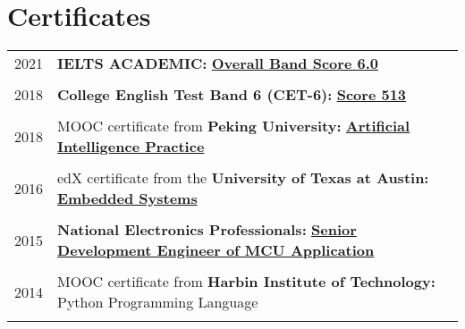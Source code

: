 \documentclass[a4paper,10pt]{article} %
\begin{document}
\section{Certificates}
\begin{tabular}{r|l}	
2021                        & \textbf{IELTS ACADEMIC:} \href{https://nbviewer.org/github/HuangJiaLian/DataBase0/blob/cd031badd0d3f5841b182a9bf8b0a2daa9b96f84/uPic/2021_12_04_15_IELTS.pdf}{\textbf{Overall Band Score 6.0}}\\
\multicolumn{2}{c}{} \\	%

2018                        & \textbf{College English Test Band 6 (CET-6):} \href{https://nbviewer.org/github/HuangJiaLian/DataBase0/blob/fc6547e18e86cdb0584c398827f9f83a50d3c04b/uPic/2021_12_04_15_CET6.pdf}{\textbf{Score 513}}\\
\multicolumn{2}{c}{} \\	%

2018                        & MOOC certificate from \textbf{Peking University:} \href{https://nbviewer.org/github/HuangJiaLian/DataBase0/blob/edd29a7b30885820fabc6720dac9bd56c0cb9851/uPic/2021_11_26_10_Peking_AI.png}{\textbf{Artificial Intelligence Practice}}\\
\multicolumn{2}{c}{} \\	%

2016                        & edX certificate from the \textbf{University of Texas at Austin:} \href{https://nbviewer.org/github/HuangJiaLian/DataBase0/blob/37d6fc3eadd7a5276f030f00b0a618de66df0e78/uPic/2021_11_26_09_UTAustinX_UT.6.03x_Certificate_edX.pdf}{\textbf{Embedded Systems} }\\   	
\multicolumn{2}{c}{} \\	%

2015                     & 
\textbf{National Electronics Professionals:}  \href{https://nbviewer.org/github/HuangJiaLian/DataBase0/blob/f0bbfb6e2f2189b6ae0c43100579b9605faed6a6/uPic/2021_11_26_12_8.png}{\textbf{Senior Development Engineer of MCU Application}}\\
\multicolumn{2}{c}{} \\	%

2014                     & MOOC certificate from \textbf{Harbin Institute of Technology:} Python Programming Language \\
\multicolumn{2}{c}{} \\	%


\end{tabular}
\end{document}
